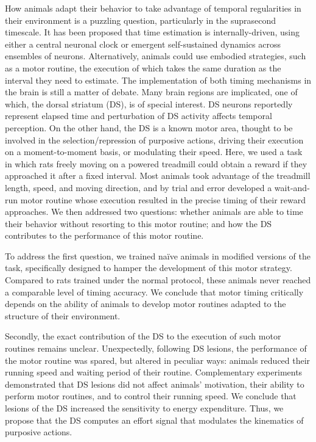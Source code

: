 How animals adapt their behavior to take advantage of temporal regularities in their environment is a puzzling question, particularly in the suprasecond timescale.
It has been proposed that time estimation is internally-driven, using either a central neuronal clock or emergent self-sustained dynamics across ensembles of neurons.
Alternatively, animals could use embodied strategies, such as a motor routine, the execution of which takes the same duration as the interval they need to estimate.
The implementation of both timing mechanisms in the brain is still a matter of debate.
Many brain regions are implicated, one of which, the dorsal striatum (DS), is of special interest.
DS neurons reportedly represent elapsed time and perturbation of DS activity affects temporal perception.
On the other hand, the DS is a known motor area, thought to be involved in the selection/repression of purposive actions, driving their execution on a moment-to-moment basis, or modulating their speed.
Here, we used a task in which rats freely moving on a powered treadmill could obtain a reward if they approached it after a fixed interval.
Most animals took advantage of the treadmill length, speed, and moving direction, and by trial and error developed a wait-and-run motor routine whose execution resulted in the precise timing of their reward approaches.
We then addressed two questions:
    whether animals are able to time their behavior without resorting to this motor routine;
    and how the DS contributes to the performance of this motor routine.

\par

To address the first question, we trained na\"ive animals in modified versions of the task, specifically designed to hamper the development of this motor strategy.
Compared to rats trained under the normal protocol, these animals never reached a comparable level of timing accuracy.
We conclude that motor timing critically depends on the ability of animals to develop motor routines adapted to the structure of their environment.

\par

Secondly, the exact contribution of the DS to the execution of such motor routines remains unclear.
Unexpectedly, following DS lesions, the performance of the motor routine was spared, but altered in peculiar ways:
    animals reduced their running speed and waiting period of their routine.
Complementary experiments demonstrated that DS lesions did not affect animals' motivation, their ability to perform motor routines, and to control their running speed.
We conclude that lesions of the DS increased the sensitivity to energy expenditure.
Thus, we propose that the DS computes an effort signal that modulates the kinematics of purposive actions.